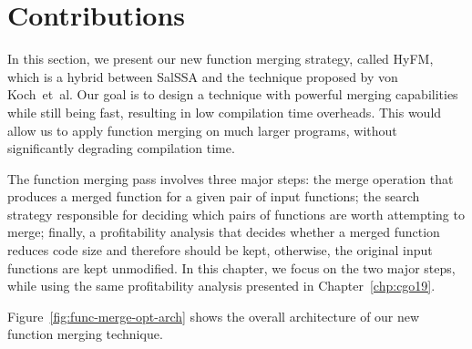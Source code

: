\section{Contributions}

In this section, we present our new function merging strategy, called HyFM, which is a hybrid between SalSSA and the technique proposed by von Koch~et~al.
Our goal is to design a technique with powerful merging capabilities while still being fast, resulting in low compilation time overheads.
This would allow us to apply function merging on much larger programs, without significantly degrading compilation time.



The function merging pass involves three major steps:
the merge operation that produces a merged function for a given pair of input functions;
the search strategy responsible for deciding which pairs of functions are worth attempting to merge;
finally, a profitability analysis that decides whether a merged function reduces code size and therefore should be kept, otherwise, the original input functions are kept unmodified.
In this chapter, we focus on the two major steps, while using the same profitability analysis presented in Chapter~\ref{chp:cgo19}.





Figure~\ref{fig:func-merge-opt-arch} shows the overall architecture of our new function merging technique.

